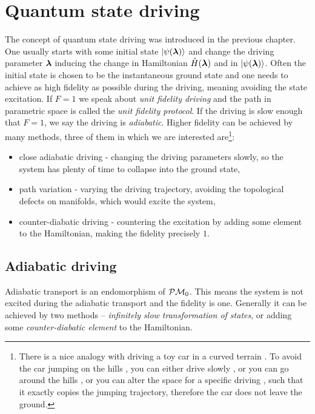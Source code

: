 \chapter{Quantum state driving}
\label{chap:typesOfDriving}
The concept of quantum state driving was introduced in the previous chapter. One usually starts with some initial state $\ket{\psi({\bm\lambda})}$ and change the driving parameter ${\bm\lambda}$ inducing the change in Hamiltonian $\hat{H}({\bm\lambda})$ and in $\ket{\psi({\bm\lambda})}$. Often the initial state is chosen to be the instantaneous ground state and one needs to achieve as high fidelity as possible during the driving, meaning avoiding the state excitation. If $F=1$ we speak about \emph{unit fidelity driving} and the path in parametric space is called the \emph{unit fidelity protocol}. If the driving is slow enough that $F=1$, we say the driving is \emph{adiabatic}. Higher fidelity can be achieved by many methods, three of them in which we are interested are\footnote{There is a nice analogy with driving a toy car  in a curved terrain . To avoid the car jumping on the hills , you can either drive slowly , or you can go around the hills , or you can alter the space for a specific driving , such that it exactly copies the jumping trajectory, therefore the car does not leave the ground.}:
\begin{itemize}
    \item close adiabatic driving - changing the driving parameters slowly, so the system has plenty of time to collapse into the ground state,
    \item path variation - varying the driving trajectory, avoiding the topological defects on manifolds, which would excite the system,
    \item counter-diabatic driving - countering the excitation by adding some element to the Hamiltonian, making the fidelity precisely $1$.
\end{itemize}



\section{Adiabatic driving}
Adiabatic transport is an endomorphism of $\mathcal{P}\mathcal{M} _0$. This means the system is not excited during the adiabatic transport and the fidelity is one. Generally it can be achieved by two methods -- \emph{infinitely slow transformation of states}, or adding some \emph{counter-diabatic element} to the Hamiltonian.


